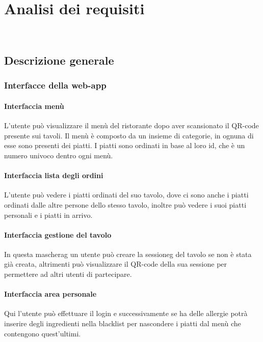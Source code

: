 
\chapter{Analisi dei requisiti}
\label{cap:analisi dei requisiti}

\\

\section{Descrizione generale}
\subsection{Interfacce della web-app}
\subsubsection{Interfaccia menù}
L'utente può visualizzare il menù del ristorante dopo aver scansionato il QR-code presente sui tavoli. Il menù è composto da un insieme di categorie, in ognuna di esse sono presenti dei piatti. I piatti sono ordinati in base al loro id, che è un numero univoco dentro ogni menù.
\subsubsection{Interfaccia lista degli ordini}
L'utente può vedere i piatti ordinati del suo tavolo, dove ci sono anche i piatti ordinati dalle altre persone dello stesso tavolo, inoltre può vedere i suoi piatti personali e i piatti in arrivo.
\subsubsection{Interfaccia gestione del tavolo}
In questa \gls{mascherag} un utente può creare la \gls{sessioneg} del tavolo se non è stata già creata, altrimenti può visualizzare il QR-code della sua sessione per permettere ad altri utenti di partecipare.
\subsubsection{Interfaccia area personale}
Qui l'utente può effettuare il login e successivamente se ha delle allergie potrà inserire degli ingredienti nella blacklist per nascondere i piatti dal menù che contengono quest'ultimi.
